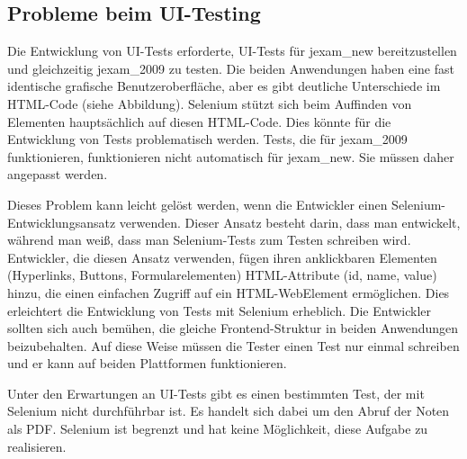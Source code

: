 \subsection{Probleme beim UI-Testing}


Die Entwicklung von UI-Tests erforderte, UI-Tests für \gls{jexam_new}
bereitzustellen und gleichzeitig \gls{jexam_2009} zu testen. Die beiden
Anwendungen haben eine fast identische grafische Benutzeroberfläche,
aber es gibt deutliche Unterschiede im HTML-Code (siehe Abbildung).
Selenium stützt sich beim Auffinden von Elementen hauptsächlich auf
diesen HTML-Code. Dies könnte für die Entwicklung von Tests
problematisch werden. Tests, die für \gls{jexam_2009} funktionieren,
funktionieren  nicht automatisch  für \gls{jexam_new}. Sie müssen daher
angepasst werden.


Dieses Problem kann leicht gelöst werden, wenn die Entwickler
einen Selenium-Entwicklungsansatz verwenden. Dieser Ansatz
besteht darin, dass man entwickelt, während man weiß, dass man
Selenium-Tests zum Testen schreiben wird. Entwickler, die diesen
Ansatz verwenden, fügen ihren anklickbaren Elementen (Hyperlinks,
Buttons, Formularelementen) HTML-Attribute (id, name, value) hinzu,
die einen einfachen Zugriff auf ein HTML-WebElement ermöglichen.
Dies erleichtert die Entwicklung von Tests mit Selenium erheblich.
Die Entwickler sollten sich auch bemühen, die gleiche
Frontend-Struktur in beiden Anwendungen beizubehalten. Auf diese
Weise müssen die Tester einen Test nur einmal schreiben und er
kann auf beiden Plattformen funktionieren.

Unter den Erwartungen an UI-Tests gibt es einen bestimmten Test,
der mit Selenium nicht durchführbar ist. Es handelt sich dabei um
den Abruf der Noten als PDF. Selenium ist begrenzt und hat keine
Möglichkeit, diese Aufgabe zu realisieren.

